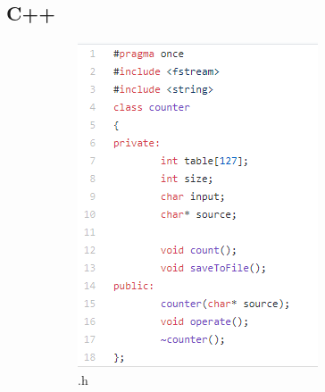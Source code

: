 \documentclass[]{article}
\begin{document}
\subsection{C++}
\begin{figure}[H]
	\centering
	\begin{subfigure}{.5\textwidth}
		\centering
		\includegraphics[width=0.7\linewidth]{h_code}
		\caption{.h}
		\label{fig:sub1}
	\end{subfigure}%
	\begin{subfigure}{.5\textwidth}
		\centering

\end{subfigure}
\end{figure}
\end{document}
